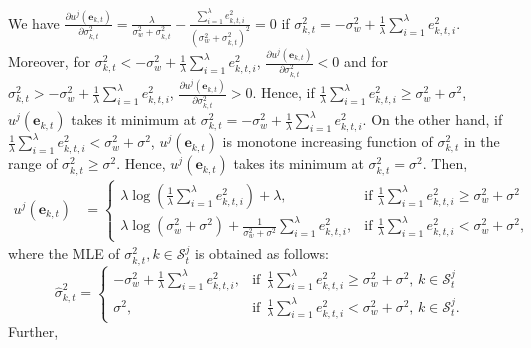 \documentclass[onecolumn]{IEEEtran}
\begin{document}
We have $\frac{\partial u^j(\mathbf{e}_{k,t})}{\partial \sigma_{k,t}^2} = \frac{\lambda}{\sigma_w^2 + \sigma_{k,t}^2} - \frac{ \sum_{i=1}^{\lambda} e_{k,t,i}^2}{(\sigma_w^2 + \sigma_{k,t}^2)^2} = 0$ if $\sigma_{k,t}^2 = - \sigma_w^2 + \frac{1}{\lambda} \sum_{i=1}^{\lambda} e_{k,t,i}^2$. Moreover, for $\sigma_{k,t}^2 < - \sigma_w^2 + \frac{1}{\lambda} \sum_{i=1}^{\lambda} e_{k,t,i}^2$, $\frac{\partial u^j(\mathbf{e}_{k,t})}{\partial \sigma_{k,t}^2} < 0$ and for $\sigma_{k,t}^2 > - \sigma_w^2 + \frac{1}{\lambda} \sum_{i=1}^{\lambda} e_{k,t,i}^2$, $\frac{\partial u^j(\mathbf{e}_{k,t})}{\partial \sigma_{k,t}^2} > 0$. Hence, if $\frac{1}{\lambda} \sum_{i=1}^{\lambda} e_{k,t,i}^2 \geq \sigma_w^2 + \sigma^2$, $u^j(\mathbf{e}_{k,t})$ takes it minimum at $\sigma_{k,t}^2 = - \sigma_w^2 + \frac{1}{\lambda} \sum_{i=1}^{\lambda} e_{k,t,i}^2$. On the other hand, if $\frac{1}{\lambda} \sum_{i=1}^{\lambda} e_{k,t,i}^2 < \sigma_w^2 + \sigma^2$, $u^j(\mathbf{e}_{k,t})$ is monotone increasing function of $\sigma_{k,t}^2$ in the range of $\sigma_{k,t}^2 \geq \sigma^2$. Hence, $u^j(\mathbf{e}_{k,t})$ takes its minimum at $\sigma_{k,t}^2 = \sigma^2$. Then,
\begin{align}  \nonumber
u^j(\mathbf{e}_{k,t}) &= \begin{cases}
  \lambda \log(\frac{1}{\lambda} \sum_{i=1}^{\lambda} e_{k,t,i}^2) + \lambda, & \mbox{if } \frac{1}{\lambda} \sum_{i=1}^{\lambda} e_{k,t,i}^2 \geq \sigma_w^2 + \sigma^2 \\
  \lambda \log(\sigma_w^2 + \sigma^2) + \frac{1}{\sigma_w^2 + \sigma^2} \sum_{i=1}^{\lambda} e_{k,t,i}^2, & \mbox{if } \frac{1}{\lambda} \sum_{i=1}^{\lambda} e_{k,t,i}^2 < \sigma_w^2 + \sigma^2,
\end{cases}
\end{align}
where the MLE of $\sigma_{k,t}^2, k \in \mathcal{S}_t^j$ is obtained as follows:
\begin{equation} \label{eq:sigma_hat_kt_v1}
    \hat{\sigma}_{k,t}^2 =
    \begin{cases}
     - \sigma_w^2 + \frac{1}{\lambda} \sum_{i=1}^{\lambda} e_{k,t,i}^2 , & \text{if} ~~ \frac{1}{\lambda} \sum_{i=1}^{\lambda} e_{k,t,i}^2 \geq \sigma_w^2 + \sigma^2, \, k \in \mathcal{S}_t^j \\
     \sigma^2 , & \text{if} ~~ \frac{1}{\lambda} \sum_{i=1}^{\lambda} e_{k,t,i}^2 < \sigma_w^2 + \sigma^2, \, k \in \mathcal{S}_t^j.
    \end{cases}
\end{equation}
Further,
\end{document}
